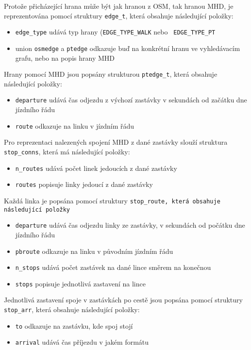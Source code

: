 Protože přicházející hrana může být jak hranou z OSM, tak hranou MHD, je
reprezentována pomocí struktury {\tt edge\_t}, která obsahuje následující
položky:
\begin{itemize}
	\item {\tt edge\_type} udává typ hrany ({\tt EDGE\_TYPE\_WALK} nebo {\tt
	EDGE\_TYPE\_PT}
	\item union {\tt osmedge} a {\tt ptedge} odkazuje buď na konkrétní hranu
	ve vyhledávacím grafu, nebo na popis hrany MHD 
\end{itemize}
Hrany pomocí MHD jsou popsány strukturou {\tt ptedge\_t}, která obsahuje
následující položky: 
\begin{itemize}
	\item {\tt departure} udává čas odjezdu z výchozí zastávky v sekundách
	od začátku dne jízdního řádu
	\item {\tt route} odkazuje na linku v jízdním řádu
\end{itemize}

Pro reprezentaci nalezených spojení MHD z dané zastávky slouží struktura {\tt
stop\_conns}, která má následující položky:
\begin{itemize}
	\item {\tt n\_routes} udává počet linek jedoucích z dané zastávky
	\item {\tt routes} popisuje linky jedoucí z dané zastávky
\end{itemize}
Každá linka je popsána pomocí struktury {\tt stop\_route, která obsahuje
následující položky} 
\begin{itemize}
	\item {\tt departure} udává čas odjezdu linky ze zastávky, v sekundách
	od počátku dne jízdního řádu 
	\item {\tt pbroute} odkazuje na linku v původním jízdním řádu
	\item {\tt n\_stops} udává počet zastávek na dané lince směrem na
	konečnou
	\item {\tt stops} popisuje jednotlivá zastavení na lince
\end{itemize}
Jednotlivá zastavení spoje v zastávkách po cestě jsou popsána pomocí struktury
{\tt stop\_arr}, která obsahuje následující položky:
\begin{itemize}
	\item {\tt to} odkazuje na zastávku, kde spoj stojí
	\item {\tt arrival} udává čas příjezdu \TODO v jakém formátu
\end{itemize}
 

